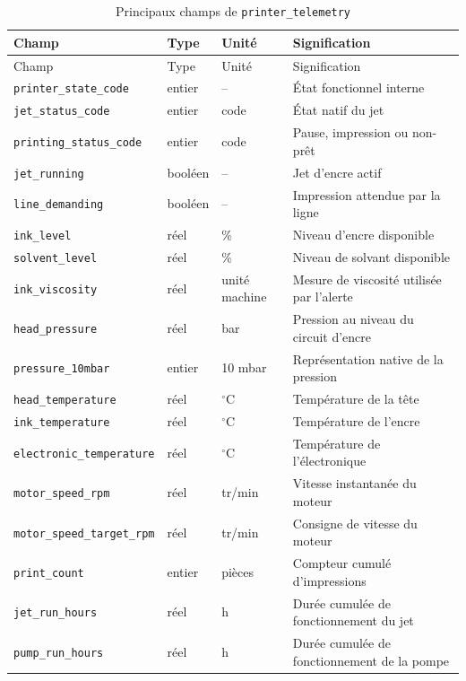 {\small
\renewcommand{\arraystretch}{1.35}
\begin{longtable}{p{}p{}p{}p{}}
\caption{Principaux champs de \texttt{printer\_telemetry}}\\
\toprule
Champ & Type & Unité & Signification \\
\midrule
\endfirsthead
\toprule
Champ & Type & Unité & Signification \\
\midrule
\endhead
\nolinkurl{printer_state_code} & entier & -- & État fonctionnel interne \\
\nolinkurl{jet_status_code} & entier & code & État natif du jet \\
\nolinkurl{printing_status_code} & entier & code & Pause, impression ou non-prêt \\
\nolinkurl{jet_running} & booléen & -- & Jet d'encre actif \\
\nolinkurl{line_demanding} & booléen & -- & Impression attendue par la ligne \\
\texttt{ink\_level} & réel & \% & Niveau d'encre disponible \\
\texttt{solvent\_level} & réel & \% & Niveau de solvant disponible \\
\texttt{ink\_viscosity} & réel & unité machine & Mesure de viscosité utilisée par l'alerte \\
\texttt{head\_pressure} & réel & bar & Pression au niveau du circuit d'encre \\
\texttt{pressure\_10mbar} & entier & 10 mbar & Représentation native de la pression \\
\texttt{head\_temperature} & réel & $^{\circ}$C & Température de la tête \\
\texttt{ink\_temperature} & réel & $^{\circ}$C & Température de l'encre \\
\texttt{electronic\_temperature} & réel & $^{\circ}$C & Température de l'électronique \\
\texttt{motor\_speed\_rpm} & réel & tr/min & Vitesse instantanée du moteur \\
\nolinkurl{motor_speed_target_rpm} & réel & tr/min & Consigne de vitesse du moteur \\
\texttt{print\_count} & entier & pièces & Compteur cumulé d'impressions \\
\texttt{jet\_run\_hours} & réel & h & Durée cumulée de fonctionnement du jet \\
\texttt{pump\_run\_hours} & réel & h & Durée cumulée de fonctionnement de la pompe \\

\end{longtable}}
